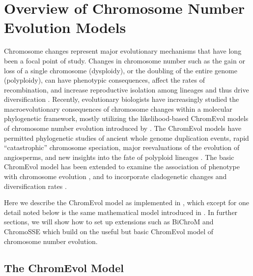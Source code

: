 \section{Overview of Chromosome Number Evolution Models} \label{sec:chromo_basic_intro}


Chromosome changes
represent major evolutionary mechanisms that have long been a focal point of study.
Changes in chromosome number such as the gain or loss of a single
chromosome (dysploidy), or the doubling of the entire genome (polyploidy),
can have phenotypic consequences,
affect the rates of recombination,
and increase reproductive isolation among lineages and thus drive diversification \citep{stebbins1971chromosomal}.
Recently, evolutionary biologists have increasingly studied the macroevolutionary
consequences of chromosome changes within a molecular phylogenetic framework,
mostly utilizing the likelihood-based ChromEvol models of chromosome number evolution
introduced by \citet{mayrose2010probabilistic}.
The ChromEvol models have permitted phylogenetic studies
of ancient whole genome duplication events,
rapid ``catastrophic'' chromosome speciation,
major reevaluations of the evolution of angiosperms,
and new insights into the fate of polyploid lineages \citep[e.g.][]{pires2008renaissance, mayrose2011recently, tank2015nested}.
The basic ChromEvol model has been extended
to examine the association of phenotype with chromosome evolution \citep[BiChroM;][]{zenil2017testing},
and to incorporate cladogenetic changes and diversification rates \citep[ChromoSSE;][]{freyman2016cladogenetic}.

Here we describe the ChromEvol model as implemented in \RevBayes,
which except for one detail noted below 
is the same mathematical model introduced in \citet{mayrose2010probabilistic}.
In further sections, we will show how to set up extensions
such as BiChroM and ChromoSSE which build on the useful but basic ChromEvol model of chromosome number evolution.


\subsection{The ChromEvol Model}


